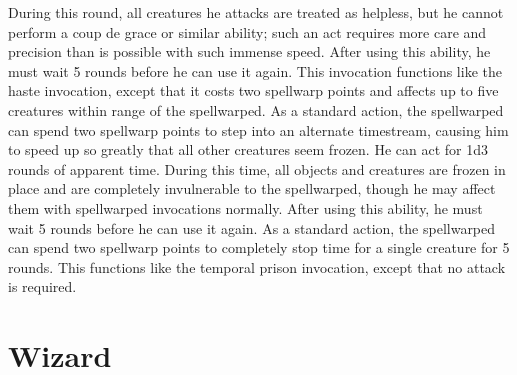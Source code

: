 During this round, all creatures he attacks are treated as helpless, but he cannot perform a coup de grace or similar ability; such an act requires more care and precision than is possible with such immense speed.
After using this ability, he must wait 5 rounds before he can use it again.
This invocation functions like the haste invocation, except that it costs two spellwarp points and affects up to five creatures within \rngclose range of the spellwarped.
As a standard action, the spellwarped can spend two spellwarp points to step into an alternate timestream, causing him to speed up so greatly that all other creatures seem frozen.
He can act for 1d3 rounds of apparent time.
During this time, all objects and creatures are frozen in place and are completely invulnerable to the spellwarped, though he may affect them with spellwarped invocations normally.
After using this ability, he must wait 5 rounds before he can use it again.
As a standard action, the spellwarped can spend two spellwarp points to completely stop time for a single creature for 5 rounds.
This functions like the temporal prison invocation, except that no attack is required.
\norepeatnotes

\section{Wizard}

